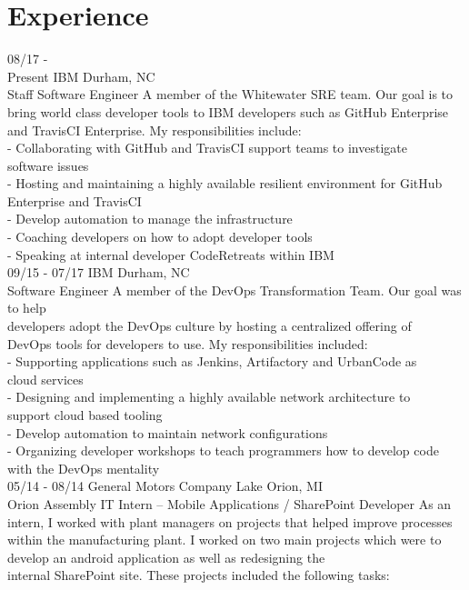 \documentclass[]{friggeri-cv}
\begin{document}
\section{Experience}
\begin{entrylist}
  \entry
    {08/17 - \\Present}
    {IBM \hfill \hfill Durham, NC}
    {\\Staff Software Engineer}
    {A member of the Whitewater SRE team. Our goal is to bring world class developer tools to IBM developers such as GitHub Enterprise and TravisCI Enterprise. My responsibilities include:\\
    - Collaborating with GitHub and TravisCI support teams to investigate \\software issues\\
    - Hosting and maintaining a highly available resilient environment for GitHub Enterprise and TravisCI\\
    - Develop automation to manage the infrastructure\\
    - Coaching developers on how to adopt developer tools\\
    - Speaking at internal developer CodeRetreats within IBM\\}
  \entry
    {09/15 - 07/17}
    {IBM \hfill \hfill Durham, NC}
    {\\Software Engineer}
    {A member of the DevOps Transformation Team. Our goal was to help \\developers adopt the DevOps culture by hosting a centralized offering of \\DevOps tools for developers to use. My responsibilities included:\\
    - Supporting applications such as Jenkins, Artifactory and UrbanCode as \\cloud services\\
    - Designing and implementing a highly available network architecture to \\support cloud based tooling\\
    - Develop automation to maintain network configurations\\
    - Organizing developer workshops to teach programmers how to develop code with the DevOps mentality\\}
  \entry
    {05/14 - 08/14}
    {General Motors Company \hfill \hfill Lake Orion, MI}
    {\\Orion Assembly IT Intern – Mobile Applications / SharePoint Developer}
    {As an intern, I worked with plant managers on projects that helped improve processes within the manufacturing plant. I worked on two main projects which were to develop an android application as well as redesigning the \\internal SharePoint site. These projects included the following tasks:\\
}
\end{entrylist}
\end{document}
